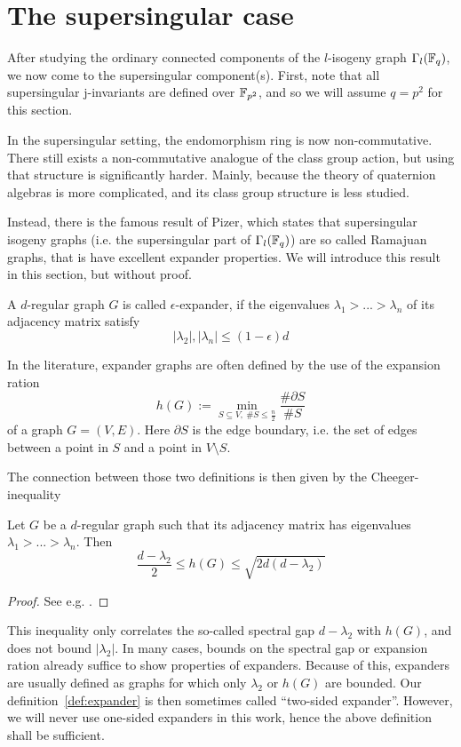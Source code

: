 \section{The supersingular case}
\label{sec:supersingular_isogeny_graph}
After studying the ordinary connected components of the $l$-isogeny graph $\Gamma_l(\mathbb{F}_q)$, we now come to the supersingular component(s).
First, note that all supersingular j-invariants are defined over $\mathbb{F}_{p^2}$, and so we will assume $q = p^2$ for this section.

In the supersingular setting, the endomorphism ring is now non-commutative.
There still exists a non-commutative analogue of the class group action, but using that structure is significantly harder.
Mainly, because the theory of quaternion algebras is more complicated, and its class group structure is less studied.

Instead, there is the famous result of Pizer, which states that supersingular isogeny graphs (i.e. the supersingular part of $\Gamma_l(\mathbb{F}_q)$) are so called Ramajuan graphs, that is have excellent expander properties.
We will introduce this result in this section, but without proof.
\begin{definition}
    \label{def:expander}
    A $d$-regular graph $G$ is called $\epsilon$-expander, if the eigenvalues $\lambda_1 > ... > \lambda_n$ of its adjacency matrix satisfy
    \begin{equation*}
        |\lambda_2|, |\lambda_n| \leq (1 - \epsilon) d
    \end{equation*}
\end{definition}
In the literature, expander graphs are often defined by the use of the expansion ration
\begin{equation*}
    h(G) := \min_{S \subseteq V, \ \#S \leq \frac n 2} \frac {\#\partial S} {\# S}
\end{equation*}
of a graph $G = (V, E)$.
Here $\partial S$ is the edge boundary, i.e. the set of edges between a point in $S$ and a point in $V \setminus S$.

The connection between those two definitions is then given by the Cheeger-inequality
\begin{prop}
    Let $G$ be a $d$-regular graph such that its adjacency matrix has eigenvalues $\lambda_1 > ... > \lambda_n$.
    Then
    \begin{equation*}
        \frac {d - \lambda_2} 2 \leq h(G) \leq \sqrt{2d(d - \lambda_2)}
    \end{equation*}
\end{prop}
\begin{proof}
    See e.g. \cite{cheeger_inequality}.
\end{proof}
This inequality only correlates the so-called spectral gap $d - \lambda_2$ with $h(G)$, and does not bound $|\lambda_2|$.
In many cases, bounds on the spectral gap or expansion ration already suffice to show properties of expanders.
Because of this, expanders are usually defined as graphs for which only $\lambda_2$ or $h(G)$ are bounded.
Our definition~\ref{def:expander} is then sometimes called ``two-sided expander''.
However, we will never use one-sided expanders in this work, hence the above definition shall be sufficient.

